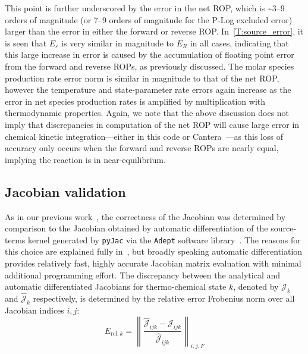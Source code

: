 \documentclass[12pt,number,sort&compress,preprint]{elsarticle}
\begin{document}
This point is further underscored by the error in the net ROP, which is \textasciitilde\numrange{3}{9} orders of magnitude (or \numrange{7}{9} orders of magnitude for the P-Log excluded error) larger than the error in either the forward or reverse ROP.
In~\cref{T:source_error}, it is seen that $E_{\varepsilon}$ is very similar in magnitude to $E_R$ in all cases, indicating that this large increase in error is caused by the accumulation of floating point error from the forward and reverse ROPs, as previously discussed.
The molar species production rate error norm is similar in magnitude to that of the net ROP, however the temperature and state-parameter rate errors again increase as the error in net species production rates is amplified by multiplication with thermodynamic properties.
Again, we note that the above discussion does not imply that discrepancies in computation of the net ROP will cause large error in chemical kinetic integration---either in this code or Cantera~\cite{Cantera}---as this loss of accuracy only occurs when the forward and reverse ROPs are nearly equal, implying the reaction is in near-equilibrium.

\subsection{Jacobian validation}
\label{S:jac_valid}

As in our previous work~\cite{Niemeyer:2016aa}, the correctness of the Jacobian was determined by comparison to the Jacobian obtained by automatic differentiation of the source-terms kernel generated by \texttt{pyJac} via the \texttt{Adept} software library~\cite{adept-v11,hogan2014fast}.
The reasons for this choice are explained fully in~\cite{Niemeyer:2016aa}, but broadly speaking automatic differentiation provides relatively fast, highly accurate Jacobian matrix evaluation with minimal additional programming effort.
The discrepancy between the analytical and automatic differentiated Jacobians for thermo-chemical state $k$, denoted by $\mathcal{J}_k$ and $\hat{\mathcal{J}}_k$ respectively, is determined by the relative error Frobenius norm over all Jacobian indices $i, j$:
\begin{equation}
 \label{e:jac_error_base}
 E_{\text{rel}, k} = \left\lVert \frac{\hat{\mathcal{J}}_{ijk} - \mathcal{J}_{ijk}}{\hat{\mathcal{J}}_{ijk}} \right\rVert_{i,j,F}
\end{equation}
\end{document}
